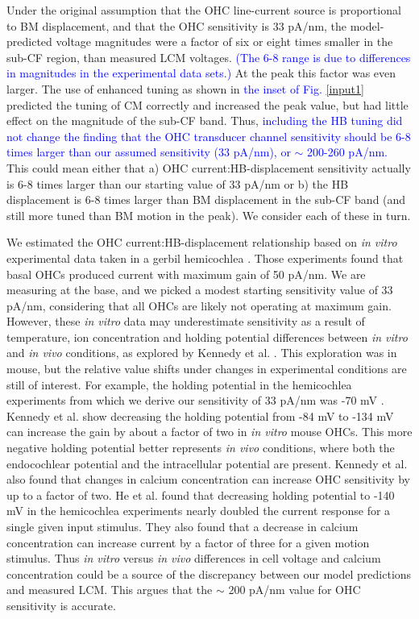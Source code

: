 \documentclass{biophys-new}
\begin{document}
\par{Under the original assumption that the OHC line-current source is proportional to BM displacement, and that the OHC sensitivity is 33 pA/nm, the model-predicted voltage magnitudes were a factor of six or eight times smaller in the sub-CF region, than measured LCM voltages. \textcolor{blue}{(The 6-8 range is due to differences in magnitudes in the experimental data sets.)} At the peak this factor was even larger. The use of enhanced tuning as shown in \textcolor{blue}{ the inset of Fig. \ref{input1}} predicted the tuning of CM correctly and increased the peak value, but had little effect on the magnitude of the sub-CF band. Thus, \textcolor{blue}{including the HB tuning did not change the finding that the OHC transducer channel sensitivity should be 6-8 times larger than our assumed sensitivity (33 pA/nm), or $\sim$ 200\textcolor{blue}{-260} pA/nm.} This could mean either that a) OHC current:HB-displacement sensitivity actually is 6-8 times larger than our starting value of 33 pA/nm or b) the HB displacement is 6-8 times larger than BM displacement in the sub-CF band (and still more tuned than BM motion in the peak). We consider each of these in turn.}  
\par{We estimated the OHC current:HB-displacement relationship based on \textit{in vitro} experimental data taken in a gerbil hemicochlea \cite{he_jia_dallos_2004}. Those experiments found that basal OHCs produced current with maximum gain of 50 pA/nm. We are measuring at the base, and we picked a modest starting sensitivity value of 33 pA/nm, considering that all OHCs are likely not operating at maximum gain.  However, these \textit{in vitro} data may underestimate sensitivity as a result of temperature, ion concentration and holding potential differences between \textit{in vitro}  and \textit{in vivo} conditions, as explored by Kennedy et al. \cite{kennedy}. This exploration was in mouse, but the relative value shifts under changes in experimental conditions are still of interest. For example, the holding potential in the hemicochlea experiments from which we derive our sensitivity of 33 pA/nm was -70 mV \cite{he_jia_dallos_2004}. Kennedy et al. show decreasing the holding potential from -84 mV to -134 mV can increase the gain by about a factor of two in \textit{in vitro} mouse OHCs. This more negative holding potential better represents \textit{in vivo} conditions, where both the endocochlear potential and the intracellular potential are present. Kennedy et al. also found that changes in calcium concentration can increase OHC sensitivity by up to a factor of two. He et al. \cite{he_jia_dallos_2004} found that decreasing holding potential to -140 mV in the hemicochlea experiments nearly doubled the current response for a single given input stimulus. They also found that a decrease in calcium concentration can increase current by a factor of three for a given motion stimulus. Thus \textit{in vitro} versus \textit{in vivo} differences in cell voltage and calcium concentration could be a source of the discrepancy between our model predictions and measured LCM. This argues that the $\sim$ 200 pA/nm value for OHC sensitivity is accurate.}
\end{document}
